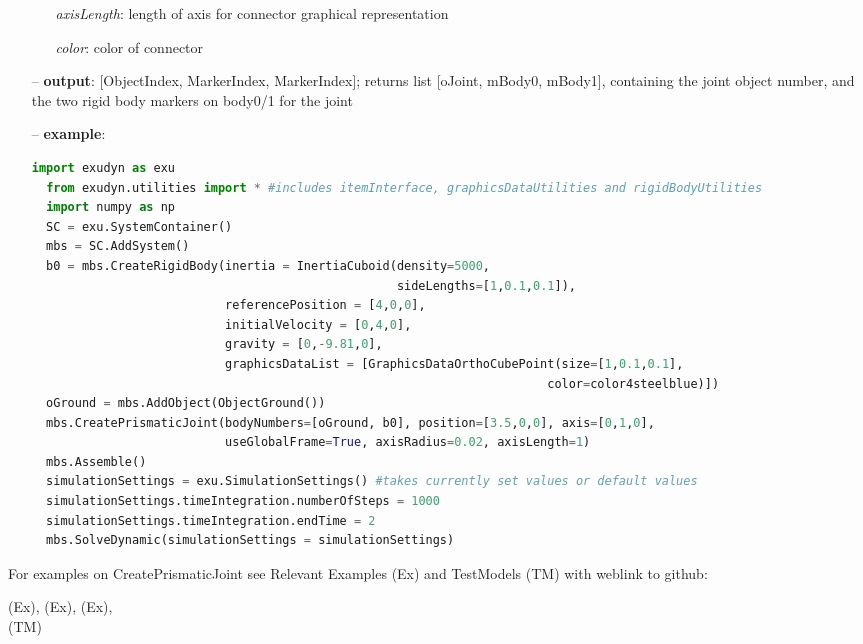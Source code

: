 \begin{itemize}[leftmargin=0.7cm]
\begin{itemize}[leftmargin=1.2cm]
\item[]{\it axisLength}: length of axis for connector graphical representation
\item[]{\it color}: color of connector
\end{itemize}
\item[--]
{\bf output}: [ObjectIndex, MarkerIndex, MarkerIndex]; returns list [oJoint, mBody0, mBody1], containing the joint object number, and the two rigid body markers on body0/1 for the joint
\item[--]
{\bf example}: \vspace{-12pt}\ei\begin{lstlisting}[language=Python, xleftmargin=36pt]
  import exudyn as exu
  from exudyn.utilities import * #includes itemInterface, graphicsDataUtilities and rigidBodyUtilities
  import numpy as np
  SC = exu.SystemContainer()
  mbs = SC.AddSystem()
  b0 = mbs.CreateRigidBody(inertia = InertiaCuboid(density=5000,
                                                   sideLengths=[1,0.1,0.1]),
                           referencePosition = [4,0,0],
                           initialVelocity = [0,4,0],
                           gravity = [0,-9.81,0],
                           graphicsDataList = [GraphicsDataOrthoCubePoint(size=[1,0.1,0.1],
                                                                        color=color4steelblue)])
  oGround = mbs.AddObject(ObjectGround())
  mbs.CreatePrismaticJoint(bodyNumbers=[oGround, b0], position=[3.5,0,0], axis=[0,1,0],
                           useGlobalFrame=True, axisRadius=0.02, axisLength=1)
  mbs.Assemble()
  simulationSettings = exu.SimulationSettings() #takes currently set values or default values
  simulationSettings.timeIntegration.numberOfSteps = 1000
  simulationSettings.timeIntegration.endTime = 2
  mbs.SolveDynamic(simulationSettings = simulationSettings)
\end{lstlisting}\vspace{-24pt}\bi\item[]\vspace{-24pt}\vspace{12pt}\end{itemize}
%

%
\noindent For examples on CreatePrismaticJoint see Relevant Examples (Ex) and TestModels (TM) with weblink to github:
\bi
 \item \footnotesize {} (Ex), 
 (Ex), 
 (Ex), 
\\  (TM)
\ei

